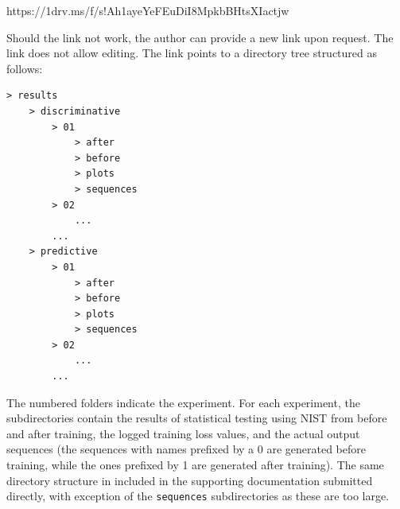 \documentclass[12pt, titlepage]{report}
\theoremstyle{definition}
\begin{document}
https://1drv.ms/f/s!Ah1ayeYeFEuDiI8MpkbBHtsXIactjw

Should the link not work, the author can provide a new link upon request. The link does not allow editing. The link points to a directory tree structured as follows:

\begin{verbatim}   
> results
    > discriminative
        > 01
            > after
            > before
            > plots
            > sequences            
        > 02
            ...
        ...
    > predictive
        > 01
            > after
            > before
            > plots
            > sequences
        > 02
            ...
        ...
\end{verbatim}

The numbered folders indicate the experiment. For each experiment, the subdirectories contain the results of statistical testing using NIST from before and after training, the logged training loss values, and the actual output sequences (the sequences with names prefixed by a 0 are generated before training, while the ones prefixed by 1 are generated after training). The same directory structure in included in the supporting documentation submitted directly, with exception of the \texttt{sequences} subdirectories as these are too large.
\end{document}
